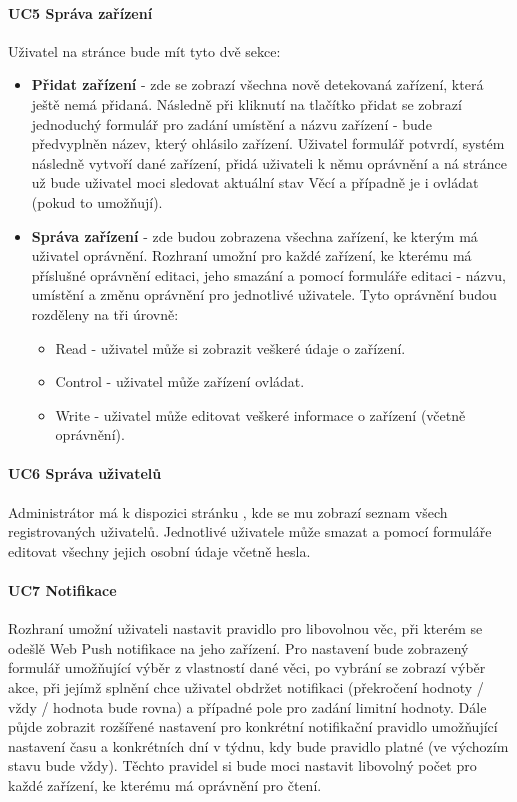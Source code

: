 \paragraph{UC5 Správa zařízení}
\label{UC5}
Uživatel na stránce  bude mít tyto dvě sekce:
\begin{itemize}
    \item \textbf{Přidat zařízení} - zde se zobrazí všechna nově detekovaná zařízení, která ještě nemá přidaná. Následně při kliknutí na tlačítko přidat se zobrazí jednoduchý formulář pro zadání umístění a názvu zařízení - bude předvyplněn název, který ohlásilo zařízení. Uživatel formulář potvrdí, systém následně vytvoří dané zařízení, přidá uživateli k němu oprávnění a ná stránce  už bude uživatel moci sledovat aktuální stav Věcí a případně je i ovládat (pokud to umožňují).
    \item  \textbf{Správa zařízení} - zde budou zobrazena všechna zařízení, ke kterým má uživatel oprávnění. Rozhraní umožní pro každé zařízení, ke kterému má příslušné oprávnění editaci, jeho smazání a pomocí formuláře editaci - názvu, umístění a změnu oprávnění pro jednotlivé uživatele. Tyto oprávnění budou rozděleny na tři úrovně:
          \begin{itemize}
              \item Read - uživatel může si zobrazit veškeré údaje o zařízení.
              \item Control - uživatel může zařízení ovládat.
              \item Write - uživatel může editovat veškeré informace o zařízení (včetně oprávnění).
          \end{itemize}
\end{itemize}

\paragraph{UC6 Správa uživatelů}
Administrátor má k dispozici stránku , kde se mu zobrazí seznam všech registrovaných uživatelů. Jednotlivé uživatele může smazat a pomocí formuláře editovat všechny jejich osobní údaje včetně hesla.

\paragraph{UC7 Notifikace}
Rozhraní umožní uživateli nastavit pravidlo pro libovolnou věc, při kterém se odešlě Web Push notifikace na jeho zařízení. Pro nastavení bude zobrazený formulář umožňující výběr z vlastností dané věci, po vybrání se zobrazí výběr akce, při jejímž splnění chce uživatel obdržet notifikaci (překročení hodnoty / vždy / hodnota bude rovna) a případné pole pro zadání limitní hodnoty. Dále půjde zobrazit rozšířené nastavení pro konkrétní notifikační pravidlo umožňující nastavení času a konkrétních dní v týdnu, kdy bude pravidlo platné (ve výchozím stavu bude vždy). Těchto pravidel si bude moci nastavit libovolný počet pro každé zařízení, ke kterému má oprávnění pro čtení.



